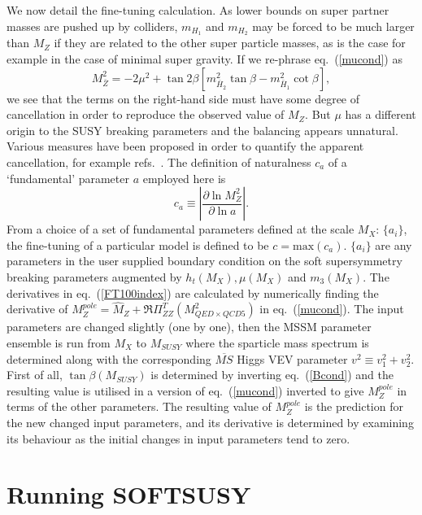 \documentclass{article}
\begin{document}
We now detail the fine-tuning calculation. 
As lower bounds on super partner masses are pushed up by colliders,
$m_{H_1}$ and $m_{H_2}$ may be forced to be much larger than $M_Z$ if they are
related to the other super particle masses, as is the case
for example in the case of 
minimal super gravity. 
If we re-phrase eq.~(\ref{mucond}) as
\begin{equation}
M_{\bar Z}^2  = -2
\mu^2 + \tan 2\beta \left[m_{\bar{H}_2}^2\tan \beta
- m_{\bar{H}_1}^2  \cot \beta \right],
\end{equation}
we see that the terms on the right-hand side must have 
some degree of cancellation in order to reproduce the 
observed value of $M_Z$.
But $\mu$ has a different origin to the SUSY breaking parameters and the
balancing appears unnatural. Various measures have
been proposed in order to quantify the apparent cancellation, for
example refs.~\cite{Barbieri:1998uv,deCarlos:1993yy}.
The definition of naturalness $c_a$ 
of a `fundamental' parameter $a$ employed here is~\cite{deCarlos:1993yy} 
\begin{equation}
c_a \equiv \left| \frac{\partial \ln M_Z^2}{\partial \ln a} \right|.
\label{FT100index}
\end{equation}
From a choice of a set of fundamental parameters defined at the scale $M_X$:
$\{ a_i \}$, the 
fine-tuning of a particular model is defined to be $c=\mbox{max}(c_a)$.
$\{ a_i \}$ are any parameters in the user supplied boundary condition on the
soft supersymmetry breaking parameters augmented by $h_t(M_X), \mu(M_X)$ and
$m_3(M_X)$. The derivatives in eq.~(\ref{FT100index}) are calculated by 
numerically finding the derivative of $M_Z^{pole}=\hat M_Z +
\Re\Pi_{ZZ}^T(M_{QED \times QCD5}^2)$ in eq.~(\ref{mucond}). 
The input parameters are
changed slightly (one by one), then the MSSM parameter ensemble is run from 
$M_X$ to $M_{SUSY}$ where the sparticle mass spectrum is determined along with the
corresponding $\overline{MS}$ Higgs VEV parameter
$v^2 \equiv v_1^2 + v_2^2$. 
First of all, $\tan \beta(M_{SUSY})$ is determined by inverting
eq.~(\ref{Bcond}) and the resulting value is utilised in a version of
eq.~(\ref{mucond}) inverted to give $M_Z^{pole}$ in terms of the other
parameters.
The resulting value of $M_Z^{pole}$ is the
prediction for the new changed input parameters, and its derivative is
determined by examining its behaviour as the initial changes in input
parameters tend to zero.



\appendix

\section{Running SOFTSUSY}
\label{sec:run}
\end{document}
